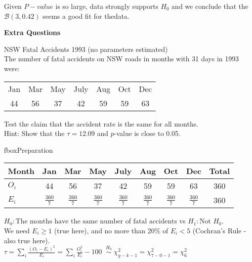 \documentclass[bigtut]{tutorial}\usepackage[]{graphicx}\usepackage[]{color}
\begin{document}
\begin{tutorial}
\begin{questions}
\begin{solution}
Given $P-value$ is so large, data strongly supports $H_{0}$ and we conclude that the $\mathcal B(3,0.42)$ seems a good fit for thedata.
\end{solution}






\newpage
\hspace{-1cm} {\bf Extra Questions}



\question NSW Fatal Accidents 1993 (no parameters estimated) \\

The number of fatal accidents on NSW
roads in months with 31 days in 1993 were:
\begin{center}
\begin{tabular}{ccccccc}
Jan&Mar&May&July&Aug&Oct&Dec\\
 44&56&37&42&59&59&63\\
\end{tabular}
\end{center}
Test the claim that the accident rate is the same for all months.  \\

Hint: Show that the $\tau = 12.09$ and $p$-value is close to 0.05. 


\begin{solution}
fbox{Preparation} \\

\begin{tabular}{| l| ccccccc | c |} \hline
Month  & Jan & Mar & May & July & Aug & Oct & Dec & Total \\ \hline
$O_{i}$ & 44 & 56 & 37 & 42 & 59 & 59 & 63 & 360 \\ \hline
$E_{i}$ & $\frac{360}{7}$ & $\frac{360}{7}$ & $\frac{360}{7} $ & $\frac{360}{7}$ & $\frac{360}{7}$ & $\frac{360}{7}$ & $\frac{360}{7}$  & 360 \\  \hline
\end{tabular}

\vspace{.5cm}
 $H_0: \text{The months have the same number of fatal accidents}$ \;\; vs $H_1: \text{Not } H_{0}$. \\

 We need $E_{i} \geq 1$ (true here), and no more than 20\% of $E_{i} < 5$ (Cochran's Rule - also true here).\\

 $\tau = \sum_{i}  \frac{  (O_i - E_i)^2  } {  E_i }  =   \sum_{i}  \frac{  O_i^2  } {  E_i }  -100   \; \; 
\overset{H_0}{\sim} \; \chi^2_{g-k-1} = \chi^2_{7-0-1} = \chi^2_{6}$ \\


\end{solution}
\end{questions}
\end{tutorial}
\end{document}
